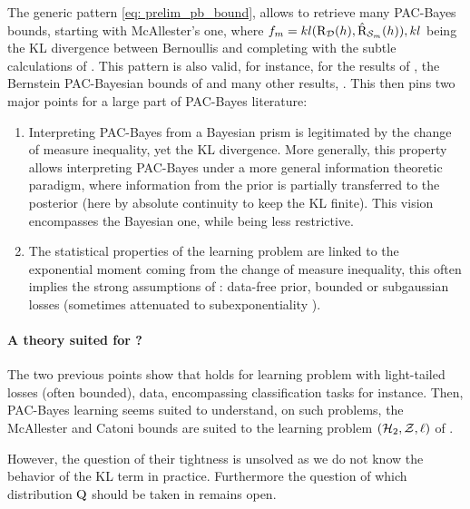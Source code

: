 The generic pattern \eqref{eq: prelim_pb_bound}, allows to retrieve many PAC-Bayes bounds, starting with McAllester's one, where $f_m= kl(\text{R}_{\mathcal{D}}(h),\hat{\text{R}}_{\mathcal{S}_m}(h)), kl$ being the KL divergence between Bernoullis and completing with the subtle calculations of \citet{maurer2004note}. This pattern is also valid, for instance, for the results of \citet{germain2009pac}, the Bernstein PAC-Bayesian bounds of \citet{tolstikhin2013pac,mhammedi2019pac} and many other results, \eg \citet{thiemann2017strongly,guedj2018pac,holland2019pac,wu2022split}. This then pins two major points for a large part of PAC-Bayes literature: 

\begin{enumerate}
  \item Interpreting PAC-Bayes from a Bayesian prism is legitimated by the change of measure inequality, yet the KL divergence. More generally, this property allows interpreting PAC-Bayes under a more general information theoretic paradigm, where information from the prior is partially transferred to the posterior (here by absolute continuity to keep the KL finite). This vision encompasses the Bayesian one, while being less restrictive.
  \item The statistical properties of the learning problem are linked to the exponential moment coming from the change of measure inequality, this often implies the strong assumptions of : data-free prior, bounded or subgaussian losses (sometimes attenuated to subexponentiality \citealp{catoni2004statistical}).
\end{enumerate}

\paragraph{A theory suited for ?}
The two previous points show that  holds for learning problem with light-tailed losses (often bounded), \iid data, encompassing classification tasks for instance. Then, PAC-Bayes learning seems suited to understand, on such problems, the McAllester and Catoni bounds are suited to the learning problem $(\mathcal{H}_2,\mathcal{Z},\ell)$ of . 

However, the question of their tightness is unsolved as we do not know the behavior of the KL term in practice. Furthermore the question of which distribution $\mathrm{Q}$ should be taken in  remains open.


